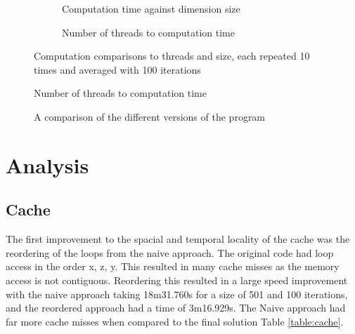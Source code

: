 \documentclass[12pt]{article}
\begin{document}
\begin{figure}
\end{figure}
\begin{figure}
    \centering
    \begin{subfigure}[b]{0.45\textwidth}
        \begin{adjustbox}{width=\textwidth}
        
        \end{adjustbox}
        \caption{Computation time against dimension size}
        \label{fig:st}
    \end{subfigure}
    \begin{subfigure}[b]{0.45\textwidth}
        \begin{adjustbox}{width=\textwidth}
        
        \end{adjustbox}
        \caption{Number of threads to computation time}
        \label{fig:tt}
    \end{subfigure}
    \caption{Computation comparisons to threads and size, each repeated 10 times and averaged with 100 iterations}
    \label{fig:speed}
\end{figure}


\begin{figure}[H]
    \centering
    
    \caption{Number of threads to computation time}
    \label{fig:speed2}
\end{figure}

\begin{figure}
    \centering
    \begin{adjustbox}{width=0.6\textwidth}
    
    \end{adjustbox}
    \caption{A comparison of the different versions of the program}
    \label{fig:comp}
\end{figure}


\section{Analysis}

\subsection{Cache}
The first improvement to the spacial and temporal locality of the cache was the reordering of the loops from the naive approach.
The original code had loop access in the order x, z, y. This resulted in many cache misses as the memory access is not contiguous.
Reordering this resulted in a large speed improvement with the naive approach taking 18m31.760s for a size of 501 and 100 iterations, and the reordered approach
had a time of 3m16.929s. The Naive approach had far more cache misses when compared to the final solution Table \ref{table:cache}.
\end{document}
